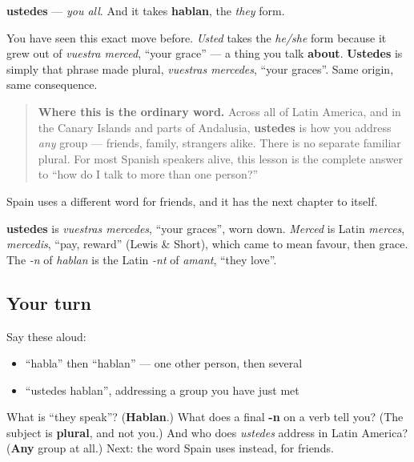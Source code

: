 \begin{grammarlens}[title={Grammar Lens: the form does a second job, exactly as habla did}]
\textbf{ustedes} — \emph{you all}. And it takes \textbf{hablan}, the \emph{they} form.

You have seen this exact move before. \emph{Usted} takes the \emph{he/she} form because it grew out of \emph{vuestra merced}, \textquotedblleft{}your grace\textquotedblright{} — a thing you talk \textbf{about}. \textbf{Ustedes} is simply that phrase made plural, \emph{vuestras mercedes}, \textquotedblleft{}your graces\textquotedblright{}. Same origin, same consequence.

\begin{quote}
\textbf{Where this is the ordinary word.} Across all of Latin America, and in the Canary Islands and parts of Andalusia, \textbf{ustedes} is how you address \emph{any} group — friends, family, strangers alike. There is no separate familiar plural. For most Spanish speakers alive, this lesson is the complete answer to \textquotedblleft{}how do I talk to more than one person?\textquotedblright{}
\end{quote}

Spain uses a different word for friends, and it has the next chapter to itself.
\end{grammarlens}

\begin{cousinweb}
\textbf{ustedes} is \emph{vuestras mercedes}, \textquotedblleft{}your graces\textquotedblright{}, worn down. \emph{Merced} is Latin \emph{merces}, \emph{mercedis}, \textquotedblleft{}pay, reward\textquotedblright{} (Lewis \& Short), which came to mean favour, then grace. The \emph{-n} of \emph{hablan} is the Latin \emph{-nt} of \emph{amant}, \textquotedblleft{}they love\textquotedblright{}.
\end{cousinweb}

\subsection*{Your turn}
Say these aloud:

\begin{itemize}
\raggedright
  \item \textquotedblleft{}habla\textquotedblright{} then \textquotedblleft{}hablan\textquotedblright{} — one other person, then several
  \item \textquotedblleft{}ustedes hablan\textquotedblright{}, addressing a group you have just met
\end{itemize}

\begin{tcolorbox}[breakable,colback=teal!4,colframe=teal!35!black,title={Before you move on}]
What is \textquotedblleft{}they speak\textquotedblright{}? (\textbf{Hablan}.) What does a final \textbf{-n} on a verb tell you? (The subject is \textbf{plural}, and not you.) And who does \emph{ustedes} address in Latin America? (\textbf{Any} group at all.) Next: the word Spain uses instead, for friends.
\end{tcolorbox}
